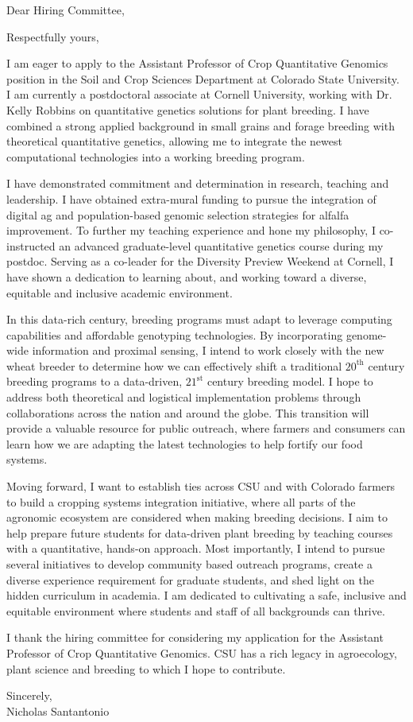 \documentclass[11pt, letterpaper]{moderncv}
\begin{document}
\date{\today}
\opening{Dear Hiring Committee,}
\closing{Respectfully yours,}
\makelettertitle

I am eager to apply to the Assistant Professor of Crop Quantitative Genomics position in the Soil and Crop Sciences Department at Colorado State University. I am currently a postdoctoral associate at Cornell University, working with Dr. Kelly Robbins on quantitative genetics solutions for plant breeding. I have combined a strong applied background in small grains and forage breeding with theoretical quantitative genetics, allowing me to integrate the newest computational technologies into a working breeding program.

I have demonstrated commitment and determination in research, teaching and leadership. I have obtained extra-mural funding to pursue the integration of digital ag and population-based genomic selection strategies for alfalfa improvement. To further my teaching experience and hone my philosophy, I co-instructed an advanced graduate-level quantitative genetics course during my postdoc. Serving as a co-leader for the Diversity Preview Weekend at Cornell, I have shown a dedication to learning about, and working toward a diverse, equitable and inclusive academic environment. 

In this data-rich century, breeding programs must adapt to leverage computing capabilities and affordable genotyping technologies. By incorporating genome-wide information and proximal sensing, I intend to work closely with the new wheat breeder to determine how we can effectively shift a traditional $20^\text{th}$ century breeding programs to a data-driven, $21^\text{st}$ century breeding model. I hope to address both theoretical and logistical implementation problems through collaborations across the nation and around the globe. This transition will provide a valuable resource for public outreach, where farmers and consumers can learn how we are adapting the latest technologies to help fortify our food systems.

Moving forward, I want to establish ties across CSU and with Colorado farmers to build a cropping systems integration initiative, where all parts of the agronomic ecosystem are considered when making breeding decisions. I aim to help prepare future students for data-driven plant breeding by teaching courses with a quantitative, hands-on approach. Most importantly, I intend to pursue several initiatives to develop community based outreach programs, create a diverse experience requirement for graduate students, and shed light on the hidden curriculum in academia. I am dedicated to cultivating a safe, inclusive and equitable environment where students and staff of all backgrounds can thrive. 

I thank the hiring committee for considering my application for the Assistant Professor of Crop Quantitative Genomics. CSU has a rich legacy in agroecology, plant science and breeding to which I hope to contribute. 

\vspace{3mm}

Sincerely,\\
\vspace{2cm}
Nicholas Santantonio
\end{document}
